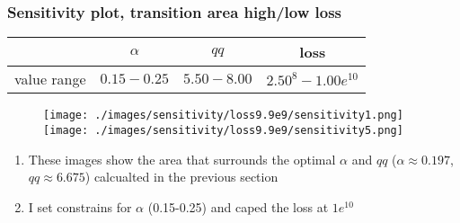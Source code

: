 \documentclass{beamer}
\begin{document}
\begin{frame}
	\frametitle{Sensitivity plot, transition area high/low loss}
	\begin{center}
		\begin{tabular}{|c|c|c|c|}
			\hline & $\alpha$ & $qq$ & loss \\
			\hline value range & $0.15-0.25$ & $5.50-8.00$ & $2.50^{8}-1.00e^{10}$\\
			\hline
		\end{tabular}
		\vspace{-0.3cm}

		\begin{figure}[htbp]
				\hspace{-1.4cm}
				\texttt{[image: ./images/sensitivity/loss9.9e9/sensitivity1.png]}\hspace{-1.0cm} %
				\texttt{[image: ./images/sensitivity/loss9.9e9/sensitivity5.png]}
		\end{figure}
	\begin{enumerate}[$\bullet$]
		\item \vspace{-0.6cm}These images show the area that surrounds the optimal $\alpha$ and $qq$ ($\alpha \approx 0.197$, $qq \approx 6.675$) calcualted in the previous section 
		\item I set constrains for $\alpha$ (0.15-0.25) and caped the loss at $1e^{10}$
	\end{enumerate}
	\end{center}
\end{frame}
\end{document}
